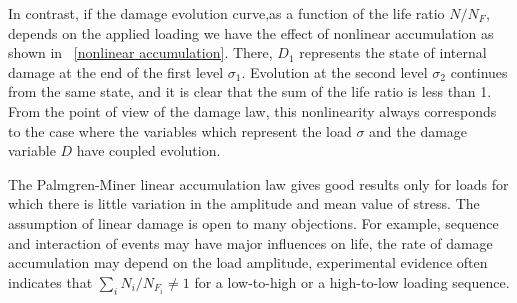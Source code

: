 \documentclass[3p,times,procedia,number]{elsarticle}
\newcommand{\figref}[1]{\figurename~\ref{#1}}
\begin{document}
In contrast, if the damage evolution curve,as a function of the life ratio $N/N_F$, depends on the applied loading we have the effect of nonlinear accumulation as shown in \figref{nonlinear accumulation}. There, $D_1$ represents the state of internal damage at the end of the first level $\sigma_1$. Evolution at the second level $\sigma_2$ continues from the same state, and it is clear that the sum of the life ratio is less than 1. From the point of view of the damage law, this nonlinearity always corresponds to the case where the variables which represent the load $\sigma$ and the damage variable $D$ have coupled evolution.

The Palmgren-Miner linear accumulation law gives good results only for loads for which there is little variation in the amplitude and mean value of stress. The assumption of linear damage is open to many objections. For example, sequence and interaction of events may have major influences on life, the rate of damage accumulation may depend on the load amplitude, experimental evidence often indicates that $\sum_{i}N_i/N_{F_i}\neq 1$ for a low-to-high or a high-to-low loading sequence.
\end{document}
